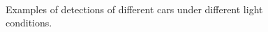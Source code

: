 \begin{figure}[p]
\hspace{2mm}
\\
\caption{Examples of detections of different cars under different light conditions.}
\label{fig:mapping_examples_1}
\end{figure}

